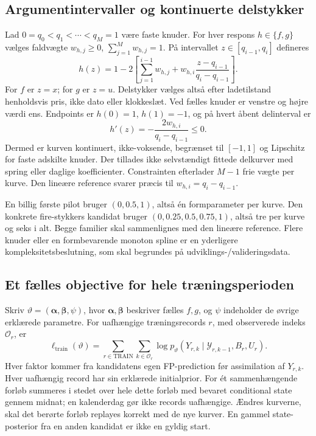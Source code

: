 \subsection{Argumentintervaller og kontinuerte delstykker}
Lad \(0=q_0<q_1<\cdots<q_M=1\) være faste knuder. For hver respons
\(h\in\{f,g\}\) vælges faldvægte \(w_{h,j}\geq0\), \(\sum_{j=1}^M w_{h,j}=1\).
På intervallet \(z\in[q_{i-1},q_i]\) defineres
\begin{equation}
 h(z)=1-2\left[\sum_{j=1}^{i-1}w_{h,j}
       +w_{h,i}\frac{z-q_{i-1}}{q_i-q_{i-1}}\right].
 \label{eq:shared_piecewise_response}
\end{equation}
For \(f\) er \(z=x\); for \(g\) er \(z=u\). Delstykker vælges altså efter
ladetilstand henholdsvis pris, ikke dato eller klokkeslæt. Ved fælles knuder er
venstre og højre værdi ens. Endpoints er \(h(0)=1\), \(h(1)=-1\), og på hvert
åbent delinterval er
\[
 h'(z)=-\frac{2w_{h,i}}{q_i-q_{i-1}}\leq0.
\]
Dermed er kurven kontinuert, ikke-voksende, begrænset til \([-1,1]\) og Lipschitz
for faste adskilte knuder. Der tillades ikke selvstændigt fittede delkurver med
spring eller daglige koefficienter. Constrainten efterlader \(M-1\) frie vægte
per kurve. Den lineære reference svarer præcis til \(w_{h,i}=q_i-q_{i-1}\).

En billig første pilot bruger \((0,0.5,1)\), altså én formparameter per kurve.
Den konkrete fire-stykkers kandidat bruger \((0,0.25,0.5,0.75,1)\), altså tre
per kurve og seks i alt. Begge familier skal sammenlignes med den lineære
reference. Flere knuder eller en formbevarende monoton spline er en yderligere
kompleksitetsbeslutning, som skal begrundes på udviklings-/valideringsdata.

\subsection{Et fælles objective for hele træningsperioden}
Skriv \(\vartheta=(\bm\alpha,\bm\beta,\psi)\), hvor \(\bm\alpha,\bm\beta\)
beskriver fælles \(f,g\), og \(\psi\) indeholder de øvrige erklærede parametre.
For uafhængige træningsrecords \(r\), med observerede indeks \(\mathcal O_r\), er
\begin{equation}
 \ell_{\mathrm{train}}(\vartheta)
 =\sum_{r\in\mathrm{TRAIN}}\sum_{k\in\mathcal O_r}
  \log p_\vartheta\!\left(Y_{r,k}\mid
       \mathcal Y_{r,k-1},B_r,U_r\right).
 \label{eq:shared_response_likelihood}
\end{equation}
Hver faktor kommer fra kandidatens egen FP-prediction før assimilation af
\(Y_{r,k}\). Hver uafhængig record har sin erklærede initialprior. For ét
sammenhængende forløb summeres i stedet over hele dette forløb med bevaret
conditional state gennem midnat; en kalenderdag gør ikke records uafhængige.
Ændres kurverne, skal det berørte forløb replayes korrekt med de nye kurver.
En gammel state-posterior fra en anden kandidat er ikke en gyldig start.


